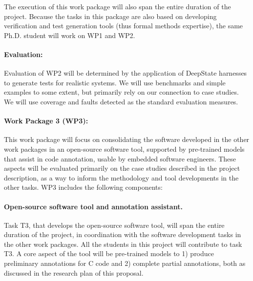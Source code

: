 The execution of this work package will also span the entire duration of the project.
Because the tasks in this package are also based on developing
verification and test generation tools (thus formal methods
expertise), the same Ph.D. student will work on WP1 and WP2. 

\paragraph{Evaluation:} Evaluation of
WP2 will be determined by the application
of DeepState harnesses to generate tests for realistic
systems.  We will use benchmarks and simple examples to some
extent, but primarily rely on our connection to case studies.
We will use coverage and faults
detected as the standard evaluation  measures.

\paragraph{Work Package 3 (WP3):}
This work package will focus on consolidating the software developed
in the other work packages in an open-source software tool, supported
by pre-trained models that assist in code annotation, usable by embedded
software engineers.  These aspects will be evaluated primarily on the
case studies described in the project description, as a way to inform the methodology and tool developments in the other tasks.
WP3 includes the following components:
\paragraph{Open-source software tool and annotation assistant.}
Task T3, that develops the open-source software tool, will span the
entire duration of the project, in coordination with the software
development tasks in the other work packages.  All the students in
this project will contribute to task T3.  A core aspect of the tool
will be pre-trained models to 1) produce preliminary annotations for C
code and 2) complete partial annotations, both as discussed in the
research plan of this proposal.


